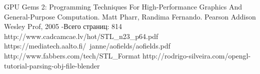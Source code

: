 









\clearpage
\begin{thebibliography}{00}
 {GPU Gems 2: Programming Techniques For High-Performance Graphics And General-Purpose Computation. Matt Pharr, Randima Fernando. Pearson Addison Wesley Prof, 2005  -Всего страниц: 814}
 {http://www.cadcamcae.lv/hot/STL_n23_p64.pdf}
 {https://mediatech.aalto.fi/~janne/aofields/aofields.pdf}
 {http://www.fabbers.com/tech/STL_Format}
 {http://rodrigo-silveira.com/opengl-tutorial-parsing-obj-file-blender}
\end{thebibliography}





